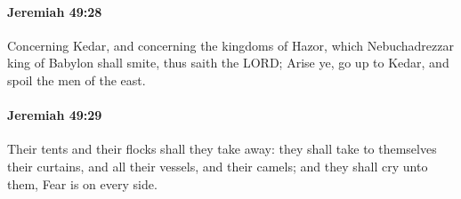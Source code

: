 		\paragraph{Jeremiah 49:28} %
			\label{JEREMIAH-49-28}

			Concerning Kedar, and concerning the kingdoms of Hazor, which Nebuchadrezzar king of Babylon shall smite, thus saith the LORD; Arise ye, go up to Kedar, and spoil the men of the east.


		\paragraph{Jeremiah 49:29} %
			\label{JEREMIAH-49-29}

			Their tents and their flocks shall they take away: they shall take to themselves their curtains, and all their vessels, and their camels; and they shall cry unto them, Fear is on every side.


